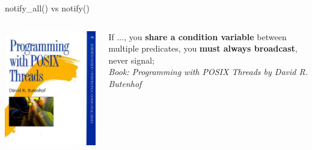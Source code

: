 \documentclass[12pt]{beamer}
\begin{document}
  \begin{frame}{notify\_all() vs notify()}
    \begin{columns}[T] %
      \begin{column}{.48\textwidth}
        \begin{center}
            \includegraphics[scale=3.0]{figures/posix_threads}
        \end{center}
      \end{column}%
      \begin{column}{.48\textwidth}
          If ..., you \textbf{share a condition variable} between multiple
          predicates, you \textbf{must always broadcast}, never signal; \\
          \textit{Book: Programming with POSIX Threads by David R. Butenhof}
      \end{column}%
    \end{columns}
  \end{frame}
\end{document}
